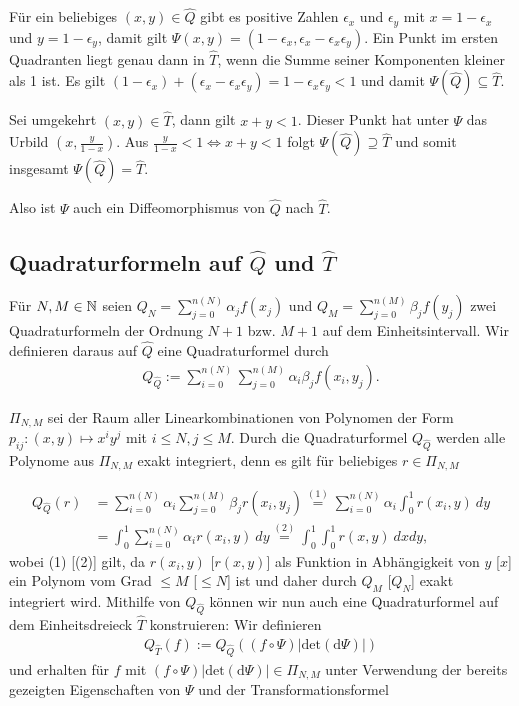  
 Für ein beliebiges $(x, y) \in \hat{Q}$ gibt es positive Zahlen $\epsilon_{x}$ und $\epsilon_{y}$ mit $x = 1 - \epsilon_{x}$ und $y = 1 - \epsilon_{y}$, damit gilt $\Psi(x,y) = (1 - \epsilon_{x}, \epsilon_{x} - \epsilon_{x} \epsilon_{y})$. Ein Punkt im ersten Quadranten liegt genau dann in $\hat{T}$, wenn die Summe seiner Komponenten kleiner als 1 ist. Es gilt $(1 - \epsilon_{x})+(\epsilon_{x} - \epsilon_{x} \epsilon_{y}) = 1 - \epsilon_{x}\epsilon_{y} < 1$ und damit $\Psi(\hat{Q}) \subseteq \hat{T}$.
 
Sei umgekehrt $(x, y) \in \hat{T}$, dann gilt $x + y < 1$. Dieser Punkt hat unter $\Psi$ das Urbild $\left(x, \frac{y}{1-x}\right)$. Aus $\frac{y}{1-x} < 1 \Leftrightarrow x + y < 1$ folgt $\Psi(\hat{Q}) \supseteq \hat{T}$ und somit insgesamt $\Psi(\hat{Q}) = \hat{T}$.

Also ist $\Psi$ auch ein Diffeomorphismus von $\hat{Q}$ nach $\hat{T}$.
\newline
\newline
\newpage
\subsection{Quadraturformeln auf $\hat{Q}$ und $\hat{T}$}
Für $N, M \in \mathbb{N}$ seien $Q_{N} = \sum_{j=0}^{n(N)}\alpha_{j}f(x_{j})$ und $Q_{M} = \sum_{j=0}^{n(M)}\beta_{j}f(y_{j})$ zwei Quadraturformeln der Ordnung $N+1$ bzw. $M+1$ auf dem Einheitsintervall. Wir definieren daraus auf $\hat{Q}$ eine Quadraturformel durch \begin{align*}{Q_{\hat{Q}} := \sum_{i=0}^{n(N)}\sum_{j=0}^{n(M)}\alpha_{i}\beta_{j}f(x_{i},y_{j}).}
\end{align*}



$\Pi_{N,M}$ sei der Raum aller Linearkombinationen von Polynomen der Form $p_{ij}: (x,y) \mapsto x^i y^j$ mit $i \leq N, j \leq M$.
Durch die Quadraturformel $Q_{\hat{Q}}$ werden alle Polynome aus $\Pi_{N,M}$ exakt integriert, denn es gilt für beliebiges $r \in \Pi_{N,M}$

\begin{align*}
    Q_{\hat{Q}}(r) &= \sum_{i=0}^{n(N)}\alpha_{i}\sum_{j=0}^{n(M)}\beta_{j}r(x_{i},y_{j}) \stackrel{(1)}{=} \sum_{i=0}^{n(N)}\alpha_{i}\int_{0}^{1}r(x_{i},y)~dy \\
    &= \int_{0}^{1}\sum_{i=0}^{n(N)}\alpha_{i}r(x_{i},y)~dy \stackrel{(2)}{=} \int_{0}^{1}\int_{0}^{1}r(x,y)~dxdy,
\end{align*}
wobei (1) [(2)] gilt, da $r(x_{i}, y)$ [$r(x,y)$] als Funktion in Abhängigkeit von $y$ [$x$] ein Polynom vom Grad $\leq M$ [$\leq N$] ist und daher durch $Q_{M}$ [$Q_{N}$] exakt integriert wird.
\newline
\newline
Mithilfe von $Q_{\hat{Q}}$ können wir nun auch eine Quadraturformel auf dem Einheitsdreieck $\hat{T}$ konstruieren: Wir definieren
\begin{align*}Q_{\hat{T}}(f) := Q_{\hat{Q}}((f\circ\Psi)|{\mathrm{det}(\mathrm{d}\Psi)}|)
\end{align*} und erhalten für $f$ mit $(f\circ\Psi)|\mathrm{det}(\mathrm{d}\Psi)| \in \Pi_{N,M}$
unter Verwendung der bereits gezeigten Eigenschaften von $\Psi$ und der Transformationsformel

